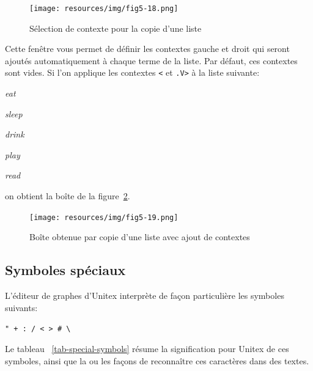 \begin{figure}[!ht]
\begin{center}
\texttt{[image: resources/img/fig5-18.png]}
\caption{Sélection de contexte pour la copie d’une
liste\label{fig-setting-contexts-for-multiple-copy}}
\end{center}
\end{figure}

\bigskip
\noindent Cette fenêtre vous permet de définir les contextes gauche et droit qui seront ajoutés
automatiquement à chaque terme de la liste. Par défaut, ces contextes sont vides. Si l’on applique
les contextes \verb+<+ et \verb+.V>+ à la liste suivante:

\medskip
\textit{eat}

\textit{sleep}

\textit{drink}

\textit{play}

\textit{read}

\medskip
\noindent on obtient la boîte de la figure~\ref{fig-multiple-copy}.

\begin{figure}[!ht]
\begin{center}
\texttt{[image: resources/img/fig5-19.png]}
\caption{Boîte obtenue par copie d’une liste avec ajout de contextes\label{fig-multiple-copy}}
\end{center}
\end{figure}

\subsection{Symboles spéciaux}
\noindent L’éditeur de graphes d’Unitex interprète de façon particulière les symboles suivants:

\medskip
\verb," + : / < > # \,

\medskip
\noindent Le tableau ~\ref{tab-special-symbols} résume la signification pour Unitex de ces symboles,
ainsi que la ou les façons de reconnaître ces caractères dans des textes.

